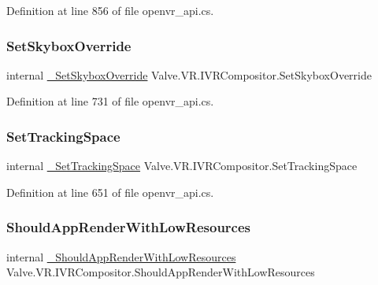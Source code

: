 Definition at line 856 of file openvr\+\_\+api.\+cs.

\mbox{\label{struct_valve_1_1_v_r_1_1_i_v_r_compositor_a484354e0ace511b6b47aa7a25157882a}} 
\subsubsection{\texorpdfstring{SetSkyboxOverride}{SetSkyboxOverride}}
{\footnotesize\ttfamily internal \mbox{\hyperlink{struct_valve_1_1_v_r_1_1_i_v_r_compositor_a6d4862a15d14c6786ea787b59a6d08c1}{\+\_\+\+Set\+Skybox\+Override}} Valve.\+V\+R.\+I\+V\+R\+Compositor.\+Set\+Skybox\+Override}



Definition at line 731 of file openvr\+\_\+api.\+cs.

\mbox{\label{struct_valve_1_1_v_r_1_1_i_v_r_compositor_a7d12544c3a7ff539b520c1ff4941aba5}} 
\subsubsection{\texorpdfstring{SetTrackingSpace}{SetTrackingSpace}}
{\footnotesize\ttfamily internal \mbox{\hyperlink{struct_valve_1_1_v_r_1_1_i_v_r_compositor_a8f3a63140b76c144825aef005d57b9a7}{\+\_\+\+Set\+Tracking\+Space}} Valve.\+V\+R.\+I\+V\+R\+Compositor.\+Set\+Tracking\+Space}



Definition at line 651 of file openvr\+\_\+api.\+cs.

\mbox{\label{struct_valve_1_1_v_r_1_1_i_v_r_compositor_aacc73748f1dfc0e1fdcfeb5129525a66}} 
\subsubsection{\texorpdfstring{ShouldAppRenderWithLowResources}{ShouldAppRenderWithLowResources}}
{\footnotesize\ttfamily internal \mbox{\hyperlink{struct_valve_1_1_v_r_1_1_i_v_r_compositor_aa6f4f906ffd776b1d99a73db6224e3dd}{\+\_\+\+Should\+App\+Render\+With\+Low\+Resources}} Valve.\+V\+R.\+I\+V\+R\+Compositor.\+Should\+App\+Render\+With\+Low\+Resources}



